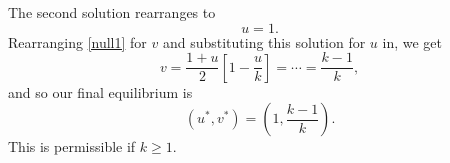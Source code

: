 \documentclass[a4paper,12pt]{article}
\begin{document}
\begin{enumerate}
{\begin{enumerate}
          The second solution rearranges to
          \begin{equation}
            u = 1.
          \end{equation}
          Rearranging \cref{null1} for $v$ and substituting this solution for $u$ in, we get
          \begin{equation}
            v = \frac{1+u}{2}\left[1-\frac{u}{k}\right] = \cdots = \frac{k-1}{k},
          \end{equation}
          and so our final equilibrium is
          \begin{equation}
            (u^*,v^*) = \left( 1, \frac{k-1}{k} \right).
          \end{equation}
          This is permissible if $k\geq 1$.


\end{enumerate}}
\end{enumerate}
\end{document}
